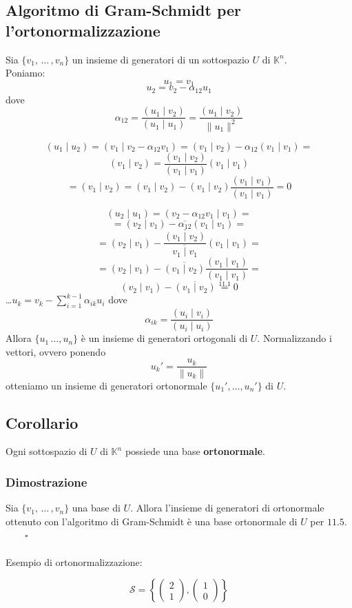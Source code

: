 \documentclass[12pt]{article}
\begin{document}
\subsection{Algoritmo di Gram-Schmidt per l'ortonormalizzazione}

Sia $\{v_1, \, \dots \, ,v_n\}$ un insieme di generatori di un sottospazio $U$ di $\mathbb{K}^n$. \\
Poniamo:
\[u_1 =  v_1\]
\[u_2 = v_2 - \alpha_{12}u_1\]
dove \[\alpha_{12} = \frac{(u_1 \mid v_2)}{(u_1 \mid u_1)} = \frac{(u_1 \mid v_2)}{\|u_1\|^2}\]

\[(u_1 \mid u_2) = (v_1 \mid v_2 - \alpha_{12}v_1) = (v_1 \mid v_2) - \alpha_{12}(v_1 \mid v_1) = \]
\[(v_1 \mid v_2) = \frac{(v_1 \mid v_2)}{(v_1 \mid v_1)} (v_1 \mid v_1)\]
\[= (v_1 \mid v_2) = (v_1 \mid v_2) - (v_1 \mid v_2)\frac{(v_1 \mid v_1)}{(v_1 \mid v_1)} = 0\]

\[(u_2 \mid u_1) = (v_2 - \alpha_{12}v_1\mid  v_1) =\]
\[= (v_2 \mid v_1) - \overline{\alpha_{12}}(v_1 \mid v_1) = \]
\[=(v_2 \mid v_1) - \frac{\bar{(v_1 \mid v_2)}}{\overline{v_1 \mid v_1}}(v_1 \mid v_1) = \]
\[= (v_2 \mid v_1) - \overline{(v_1 \mid v_2)} \frac{(v_1 \mid v_1)}{(v_1 \mid v_1)} = \]
\[(v_2 \mid v_1) - \overline{(v_1 \mid v_2)} \stackrel{11.1}{=} 0\]
\dots $u_k = v_k - \sum^{k-1}_{i=1} \alpha_{ik}u_i$ dove
\[\alpha_{ik}= \frac{(u_i \mid v_i)}{(u_i \mid u_i)}\]
Allora $\{u_1 \, \dots, u_n\}$ è un insieme di generatori ortogonali di $U$.
Normalizzando i vettori, ovvero ponendo
\[u_k' = \frac{u_k}{\|u_k\|}\]
otteniamo un insieme di generatori ortonormale $\{u_1', \dots ,u_n'\}$ di $U$.


\subsection{Corollario}

Ogni sottospazio di $U$ di $\mathbb{K}^n$ possiede una base \textbf{ortonormale}.

\subsubsection{Dimostrazione}

Sia $\{v_1, \, \dots \, ,v_n\}$ una base di $U$. Allora l'insieme di generatori
di ortonormale ottenuto con l'algoritmo di Gram-Schmidt è una base ortonormale di $U$ per $11.5$. $\quad \quad \square$
\\\\
Esempio di ortonormalizzazione:

\[\mathcal{S} = \left\{\begin{pmatrix}
    2\\
    1
\end{pmatrix}, \begin{pmatrix}
    1\\
    0
\end{pmatrix}\right\}\]
\end{document}
